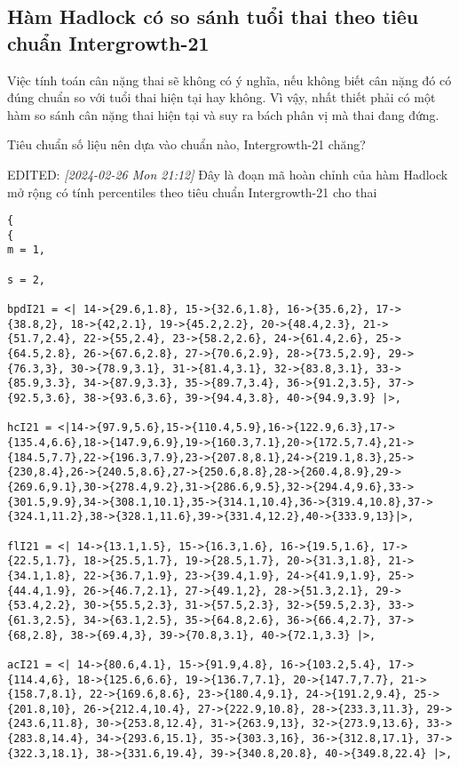 \documentclass[11pt]{article}
\begin{document}
\subsection{Hàm Hadlock có so sánh tuổi thai theo tiêu chuẩn Intergrowth-21}
\label{sec:org42f3810}
Việc tính toán cân nặng thai sẽ không có ý nghĩa, nếu không biết cân nặng đó có đúng chuẩn so với tuổi thai hiện tại hay không. Vì vậy, nhất thiết phải có một hàm so sánh cân nặng thai hiện tại và suy ra bách phân vị mà thai đang đứng.

Tiêu chuẩn số liệu nên dựa vào chuẩn nào, Intergrowth-21 chăng?

EDITED: \textit{[2024-02-26 Mon 21:12]}
Đây là đoạn mã hoàn chỉnh của hàm Hadlock mở rộng có tính percentiles theo tiêu chuẩn Intergrowth-21 cho thai

\begin{verbatim}
{
{
m = 1,

s = 2,

bpdI21 = <| 14->{29.6,1.8}, 15->{32.6,1.8}, 16->{35.6,2}, 17->{38.8,2}, 18->{42,2.1}, 19->{45.2,2.2}, 20->{48.4,2.3}, 21->{51.7,2.4}, 22->{55,2.4}, 23->{58.2,2.6}, 24->{61.4,2.6}, 25->{64.5,2.8}, 26->{67.6,2.8}, 27->{70.6,2.9}, 28->{73.5,2.9}, 29->{76.3,3}, 30->{78.9,3.1}, 31->{81.4,3.1}, 32->{83.8,3.1}, 33->{85.9,3.3}, 34->{87.9,3.3}, 35->{89.7,3.4}, 36->{91.2,3.5}, 37->{92.5,3.6}, 38->{93.6,3.6}, 39->{94.4,3.8}, 40->{94.9,3.9} |>,

hcI21 = <|14->{97.9,5.6},15->{110.4,5.9},16->{122.9,6.3},17->{135.4,6.6},18->{147.9,6.9},19->{160.3,7.1},20->{172.5,7.4},21->{184.5,7.7},22->{196.3,7.9},23->{207.8,8.1},24->{219.1,8.3},25->{230,8.4},26->{240.5,8.6},27->{250.6,8.8},28->{260.4,8.9},29->{269.6,9.1},30->{278.4,9.2},31->{286.6,9.5},32->{294.4,9.6},33->{301.5,9.9},34->{308.1,10.1},35->{314.1,10.4},36->{319.4,10.8},37->{324.1,11.2},38->{328.1,11.6},39->{331.4,12.2},40->{333.9,13}|>,

flI21 = <| 14->{13.1,1.5}, 15->{16.3,1.6}, 16->{19.5,1.6}, 17->{22.5,1.7}, 18->{25.5,1.7}, 19->{28.5,1.7}, 20->{31.3,1.8}, 21->{34.1,1.8}, 22->{36.7,1.9}, 23->{39.4,1.9}, 24->{41.9,1.9}, 25->{44.4,1.9}, 26->{46.7,2.1}, 27->{49.1,2}, 28->{51.3,2.1}, 29->{53.4,2.2}, 30->{55.5,2.3}, 31->{57.5,2.3}, 32->{59.5,2.3}, 33->{61.3,2.5}, 34->{63.1,2.5}, 35->{64.8,2.6}, 36->{66.4,2.7}, 37->{68,2.8}, 38->{69.4,3}, 39->{70.8,3.1}, 40->{72.1,3.3} |>,

acI21 = <| 14->{80.6,4.1}, 15->{91.9,4.8}, 16->{103.2,5.4}, 17->{114.4,6}, 18->{125.6,6.6}, 19->{136.7,7.1}, 20->{147.7,7.7}, 21->{158.7,8.1}, 22->{169.6,8.6}, 23->{180.4,9.1}, 24->{191.2,9.4}, 25->{201.8,10}, 26->{212.4,10.4}, 27->{222.9,10.8}, 28->{233.3,11.3}, 29->{243.6,11.8}, 30->{253.8,12.4}, 31->{263.9,13}, 32->{273.9,13.6}, 33->{283.8,14.4}, 34->{293.6,15.1}, 35->{303.3,16}, 36->{312.8,17.1}, 37->{322.3,18.1}, 38->{331.6,19.4}, 39->{340.8,20.8}, 40->{349.8,22.4} |>,


\end{verbatim}
\end{document}
